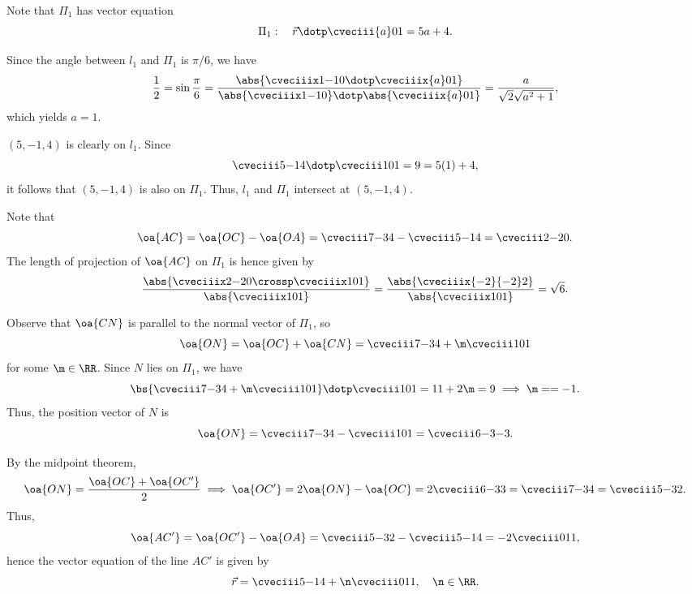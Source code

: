 \begin{solution}
    Note that $\Pi_1$ has vector equation \[\Pi_1: \quad \vec r \dotp \cveciii{a}01 = 5a + 4.\]

    \begin{ppart}
        Since the angle between $l_1$ and $\Pi_1$ is $\pi/6$, we have \[\frac12 = \sin \frac\pi6 = \frac{\abs{\cveciiix1{-1}0 \dotp \cveciiix{a}01}}{\abs{\cveciiix1{-1}0} \dotp \abs{\cveciiix{a}01}} = \frac{a}{\sqrt{2} \sqrt{a^2 + 1}},\] which yields $a = 1$.
    \end{ppart}
    \begin{ppart}
        $(5, -1, 4)$ is clearly on $l_1$. Since \[\cveciii5{-1}4 \dotp \cveciii101 = 9 = 5(1) + 4,\] it follows that $(5, -1, 4)$ is also on $\Pi_1$. Thus, $l_1$ and $\Pi_1$ intersect at $(5, -1, 4)$.
    \end{ppart}
    \begin{ppart}
        Note that \[\oa{AC} = \oa{OC} - \oa{OA} = \cveciii7{-3}4 - \cveciii5{-1}4 = \cveciii2{-2}0.\] The length of projection of $\oa{AC}$ on $\Pi_1$ is hence given by \[\frac{\abs{\cveciiix2{-2}0 \crossp \cveciiix101}}{\abs{\cveciiix101}} = \frac{\abs{\cveciiix{-2}{-2}2}}{\abs{\cveciiix101}} = \sqrt{6}.\]
    \end{ppart}
    \begin{ppart}
        Observe that $\oa{CN}$ is parallel to the normal vector of $\Pi_1$, so \[\oa{ON} = \oa{OC} + \oa{CN} = \cveciii7{-3}4 + \m \cveciii101\] for some $\m \in \RR$. Since $N$ lies on $\Pi_1$, we have \[\bs{\cveciii7{-3}4 + \m \cveciii101} \dotp \cveciii101 = 11 + 2\m = 9 \implies \m= = -1.\] Thus, the position vector of $N$ is \[\oa{ON} = \cveciii7{-3}4 - \cveciii101 = \cveciii6{-3}{-3}.\]
    \end{ppart}
    \begin{ppart}
        By the midpoint theorem, \[\oa{ON} = \frac{\oa{OC} + \oa{OC'}}{2} \implies \oa{OC'} = 2\oa{ON} - \oa{OC} = 2\cveciii6{-3}{3} = \cveciii7{-3}4 = \cveciii5{-3}2.\] Thus, \[\oa{AC'} = \oa{OC'} - \oa{OA} = \cveciii5{-3}{2} - \cveciii5{-1}4 = -2\cveciii011,\] hence the vector equation of the line $AC'$ is given by \[\vec r = \cveciii5{-1}4 + \n \cveciii011, \quad \n \in \RR.\]
    \end{ppart}
\end{solution}

